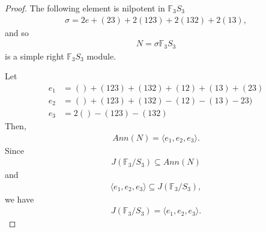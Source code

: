 \documentclass[12pt]{extarticle}
\newcommand{\<}{\langle}
\renewcommand{\>}{\rangle}
\theoremstyle{definition}
\begin{document}
\begin{proof}
  The following element is nilpotent in $\mathbb{F}_3 S_3$
  \begin{align*}
    \sigma = 2e + (23) + 2(123) + 2(132) + 2(13),
  \end{align*}
  and so 
  \begin{align*}
    N = \sigma \mathbb{F}_3S_3
  \end{align*}
  is a simple right $\mathbb{F}_3 S_3$ module.

  Let
  \begin{align*}
    e_1 &=  () + (123) + (132) + (12) + (13) + (23) \\
    e_2 &= () + (123) + (132) - (12) - (13) - 23) \\
    e_3 &= 2() - (123) - (132)
  \end{align*}
  Then,
  \begin{align*}
    Ann(N) = \< e_1, e_2, e_3 \>.
  \end{align*}
  Since
  \begin{align*}
    J(\mathbb{F}_3/S_3) \subseteq Ann(N)
  \end{align*}
  and
  \begin{align*}
    \< e_1, e_2, e_3 \> \subseteq J(\mathbb{F}_3/S_3),
  \end{align*}
  we have
  \begin{align*}
    J(\mathbb{F}_3/S_3) = \<e_1, e_2, e_3 \>.
  \end{align*}

\end{proof}
\end{document}
